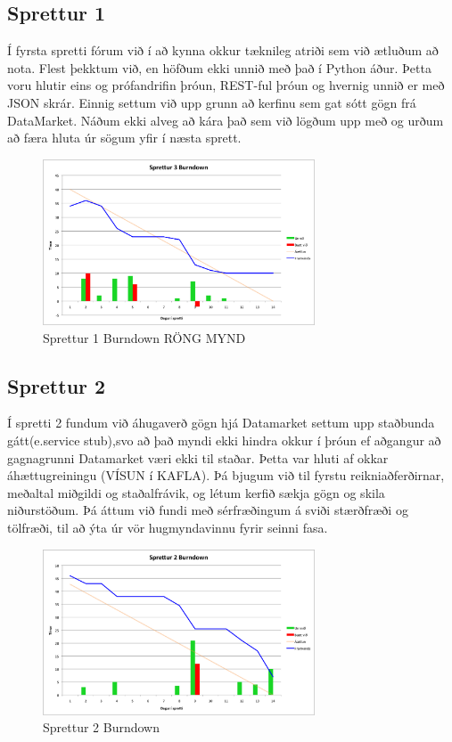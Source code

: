 \documentclass{article}
\begin{document}
\subsection{Sprettur 1}
Í fyrsta spretti fórum við í að kynna okkur tæknileg atriði sem við ætluðum að nota.
Flest þekktum við, en höfðum ekki unnið með það í Python áður. Þetta voru hlutir eins og prófandrifin þróun, REST-ful þróun og hvernig 
unnið er með JSON skrár. Einnig settum við upp grunn að kerfinu sem gat sótt gögn frá DataMarket. Náðum ekki alveg að kára það sem við lögðum 
upp með og urðum að færa hluta úr sögum yfir í næsta sprett.
\begin{figure}[H]
  \centering
  \includegraphics[width=0.72\textwidth]{Sprettur3_Burndown.png}
  \caption{Sprettur 1 Burndown RÖNG MYND}
\end{figure}

\subsection{Sprettur 2}
Í spretti 2 fundum við áhugaverð gögn hjá Datamarket settum upp staðbunda gátt(e.service stub),svo að það myndi ekki hindra okkur í þróun ef 
aðgangur að gagnagrunni Datamarket væri ekki til staðar. Þetta var hluti af okkar áhættugreiningu (VÍSUN í KAFLA). 
Þá bjugum við til fyrstu reikniaðferðirnar, meðaltal miðgildi og staðalfrávik, og létum kerfið sækja gögn og skila niðurstöðum.
Þá áttum við fundi með sérfræðingum á sviði stærðfræði og tölfræði, til að ýta úr vör hugmyndavinnu fyrir seinni fasa.
\begin{figure}[H]
 \centering
 \includegraphics[width=0.72\textwidth]{Sprettur2_Burndown.png}
 \caption{Sprettur 2 Burndown}
\end{figure}
\end{document}
